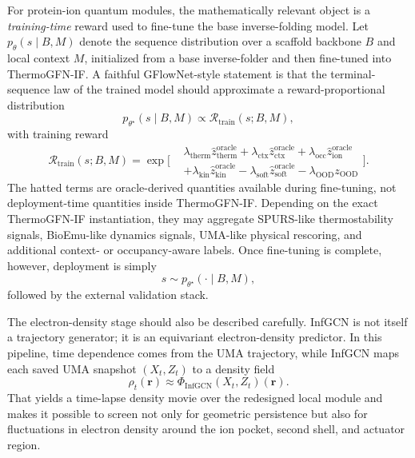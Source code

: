 \documentclass[11pt]{report}
\theoremstyle{definition}
\begin{document}
For protein-ion quantum modules, the mathematically relevant object is a \emph{training-time} reward used to fine-tune the base inverse-folding model. Let $p_{\theta}(s\mid B,M)$ denote the sequence distribution over a scaffold backbone $B$ and local context $M$, initialized from a base inverse-folder and then fine-tuned into ThermoGFN-IF. A faithful GFlowNet-style statement is that the terminal-sequence law of the trained model should approximate a reward-proportional distribution
\begin{equation}
\label{eq:trainobjective}
p_{\theta^\star}(s\mid B,M)
\propto
\mathcal R_{\mathrm{train}}(s;B,M),
\end{equation}
with training reward
\begin{equation}
\label{eq:trainreward}
\mathcal R_{\mathrm{train}}(s;B,M)
=
\exp\!\Bigg[
\begin{aligned}
&\lambda_{\mathrm{therm}} \hat z_{\mathrm{therm}}^{\mathrm{oracle}}
+ \lambda_{\mathrm{ctx}} \hat z_{\mathrm{ctx}}^{\mathrm{oracle}}
+ \lambda_{\mathrm{occ}} \hat z_{\mathrm{ion}}^{\mathrm{oracle}} \\
&+ \lambda_{\mathrm{kin}} \hat z_{\mathrm{kin}}^{\mathrm{oracle}}
- \lambda_{\mathrm{soft}} \hat z_{\mathrm{soft}}^{\mathrm{oracle}}
- \lambda_{\mathrm{OOD}} z_{\mathrm{OOD}}
\end{aligned}
\Bigg].
\end{equation}
The hatted terms are oracle-derived quantities available during fine-tuning, not deployment-time quantities inside ThermoGFN-IF. Depending on the exact ThermoGFN-IF instantiation, they may aggregate SPURS-like thermostability signals, BioEmu-like dynamics signals, UMA-like physical rescoring, and additional context- or occupancy-aware labels. Once fine-tuning is complete, however, deployment is simply
\[
s \sim p_{\theta^\star}(\cdot\mid B,M),
\]
followed by the external validation stack. 

The electron-density stage should also be described carefully. InfGCN is not itself a trajectory generator; it is an equivariant electron-density predictor. In this pipeline, time dependence comes from the UMA trajectory, while InfGCN maps each saved UMA snapshot $(X_t,Z_t)$ to a density field
\[
\rho_t(\mathbf r) \approx \Phi_{\mathrm{InfGCN}}(X_t,Z_t)(\mathbf r).
\]
That yields a time-lapse density movie over the redesigned local module and makes it possible to screen not only for geometric persistence but also for fluctuations in electron density around the ion pocket, second shell, and actuator region.
\end{document}

